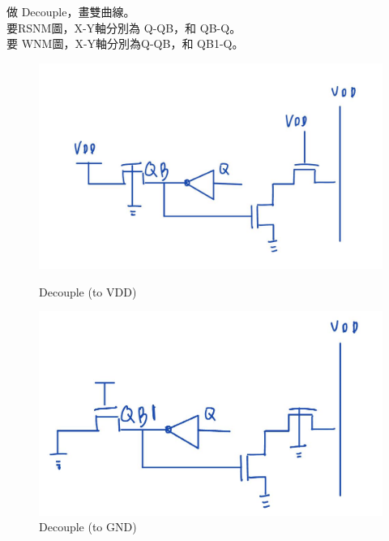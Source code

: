 \documentclass[a4paper]{article}
\begin{document}
做 Decouple，畫雙曲線。\\要RSNM圖，X-Y軸分別為 Q-QB，和 QB-Q。\\
要 WNM圖，X-Y軸分別為Q-QB，和 QB1-Q。

\begin{figure}[!htbp]
\centering
\begin{minipage}[t]{0.45\textwidth}
\centering
\includegraphics[width=\linewidth]{./img/2023-11-16-15-44-00.png}
\caption{Decouple (to VDD)}
\label{r8}
\end{minipage}
\qquad
\begin{minipage}[t]{0.4\textwidth}
\centering
\includegraphics[width=\linewidth]{./img/2023-11-16-15-45-01.png}
\caption{Decouple (to GND)}
\label{w8}
\end{minipage}
\end{figure}
\end{document}
